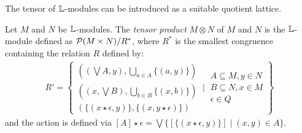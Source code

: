 %
%
%	
%	
%

The tensor of $\mathbb{L}$-modules can be introduced as a suitable quotient lattice. 

\begin{definition}
Let $M$ and $N$ be $\mathbb{L}$-modules. The \emph{tensor product} $M\otimes N$ of $M$ and $N$ is the $\mathbb{L}$-module defined as $\mathcal{P}(M\times N)/ R^{*}$, where $R^{*}$ is the smallest congruence containing the relation $R$ defined by:
\begin{align*}
R'= \left\{
\begin{matrix}
\left((\bigvee A, y), \bigcup_{a\in A}\{(a,y)\}\right)\\
\left((x,\bigvee B), \bigcup_{b\in B}\{(x,b)\}\right)\\
(\{(x\star \epsilon,y)\}, \{(x,y\star\epsilon)\})
\end{matrix}
\ \Bigg \vert\ 
\begin{matrix}
A\subseteq M, y\in N \\
B\subseteq N, x\in M \\
\epsilon \in Q
\end{matrix}
\right\}
\end{align*}
and the action is defined via $[A]\star \epsilon= \bigvee\{[ \{(x\star\epsilon,y)\}]\mid 
(x,y)\in A\}$.
\end{definition}



